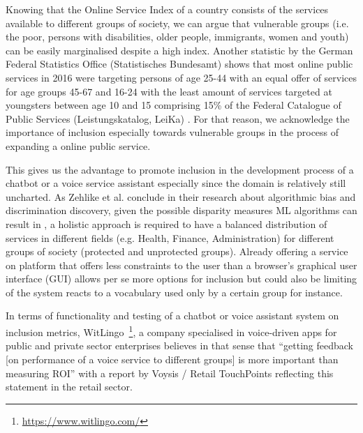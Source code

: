 Knowing that the Online Service Index of a country consists of the services available to different groups of society, we can argue that 
vulnerable groups (i.e. the poor, persons with disabilities, older people, immigrants, women and youth) can be easily marginalised despite a high index. Another statistic by the German Federal Statistics Office (Statistisches Bundesamt) shows that most online public services in 2016 were targeting persons of age 25-44 with an equal offer of services for age groups 45-67 and 16-24 with the least amount of services targeted at youngsters between age 10 and 15 comprising 15\% of the Federal Catalogue of Public Services  (Leistungskatalog, LeiKa) \cite{stabunda:leika}.
For that reason, we acknowledge the importance of inclusion especially towards vulnerable groups in the process of expanding a online public service.

This gives us the advantage to promote inclusion in the development process of a chatbot or a voice service assistant especially since the domain is relatively still uncharted. As Zehlike et al. conclude in their research about algorithmic bias and discrimination discovery, given the possible disparity measures ML algorithms can result in \cite{fa:ir}, a holistic approach is required to have a balanced distribution of services in different fields (e.g. Health, Finance, Administration) for different groups of society (protected and unprotected groups).
Already offering a service on platform that offers less constraints to the user than a browser's graphical user interface (GUI) allows per se more options for inclusion but could also be limiting of the system reacts to a vocabulary used only by a certain group for instance.

In terms of functionality and testing of a chatbot or voice assistant system on inclusion metrics, WitLingo~\footnote{\url{https://www.witlingo.com/}}, a company %
specialised in voice-driven apps %
for public and private sector enterprises believes in that sense that ``getting feedback [on performance of a voice service to different groups] is more important than measuring ROI'' \cite{witlingo:bouzid} with a report by Voysis / Retail TouchPoints \cite{voysis:report} reflecting this statement in the retail sector.



%


